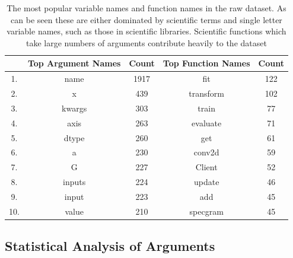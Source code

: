 \begin{table}[h!]
    \begin{center}
    \begin{tabular}{c | c | c | c | c}
        & Top Argument Names & Count  &   Top Function Names & Count \\  
        \hline               
        1.   &  name     &     1917    &   fit       &    122 \\        
        2.   &  x        &     439     &   transform &    102 \\         
        3.   &  kwargs   &     303     &   train     &    77 \\         
        4.   &  axis     &     263     &   evaluate  &    71 \\        
        5.   &  dtype    &     260     &   get       &    61 \\         
        6.   &  a        &     230     &   conv2d    &    59 \\        
        7.   &  G        &     227     &   Client    &    52 \\        
        8.   &  inputs   &     224     &   update    &    46 \\        
        9.   &  input    &     223     &   add       &    45 \\         
        10.  &  value    &     210     &   specgram  &    45 \\         
    
    \end{tabular}
    \caption {The most popular variable names and function names in the raw dataset. As can be seen these are either dominated by scientific terms and single letter variable names, such as those in scientific libraries. Scientific functions which take large numbers of arguments contribute heavily to the dataset}
    \label{table:popular_variable_names}
    \end{center}
\end{table}

\subsection{Statistical Analysis of Arguments}

